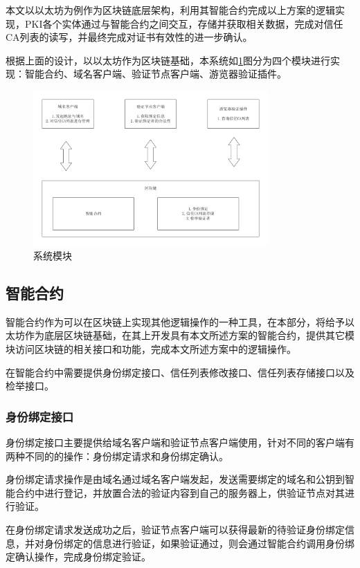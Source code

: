 本文以以太坊为例作为区块链底层架构，利用其智能合约完成以上方案的逻辑实现，PKI各个实体通过与智能合约之间交互，存储并获取相关数据，完成对信任CA列表的读写，并最终完成对证书有效性的进一步确认。

根据上面的设计，以以太坊作为区块链基础，本系统如\ref{fig:module}图分为四个模块进行实现：智能合约、域名客户端、验证节点客户端、游览器验证插件。

\begin{figure}[htbp]
 	\centering
 	\includegraphics[width = 0.8\textwidth]{img/module}
 	\caption{系统模块}\label{fig:module}
\end{figure}

\subsection{智能合约}

智能合约作为可以在区块链上实现其他逻辑操作的一种工具，在本部分，将给予以太坊作为底层区块链基础，在其上开发具有本文所述方案的智能合约，提供其它模块访问区块链的相关接口和功能，完成本文所述方案中的逻辑操作。

在智能合约中需要提供身份绑定接口、信任列表修改接口、信任列表存储接口以及检举接口。

\subsubsection{身份绑定接口}

身份绑定接口主要提供给域名客户端和验证节点客户端使用，针对不同的客户端有两种不同的的操作：身份绑定请求和身份绑定确认。

身份绑定请求操作是由域名通过域名客户端发起，发送需要绑定的域名和公钥到智能合约中进行登记，并放置合法的验证内容到自己的服务器上，供验证节点对其进行验证。

在身份绑定请求发送成功之后，验证节点客户端可以获得最新的待验证身份绑定信息，并对身份绑定的信息进行验证，如果验证通过，则会通过智能合约调用身份绑定确认操作，完成身份绑定验证。

